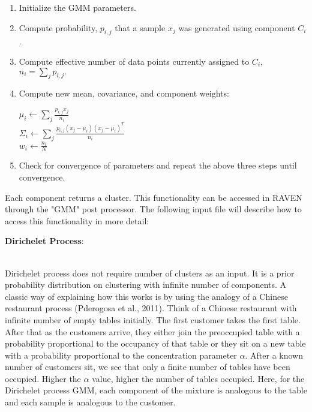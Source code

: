 \documentclass[11pt]{article}
\begin{document}
\begin{enumerate}

\item Initialize the GMM parameters.

\item Compute probability, $p_{i,j}$ that a sample $x_j$ was generated using component $C_i$.

\item Compute effective number of data points currently assigned to $C_i$, $n_i = \sum_j p_{i,j}.$

\item Compute new mean, covariance, and component weights:

\begin{center}

$\mu_i \leftarrow \sum_{j} \frac{p_{i, j} x_j}{n_i}$ \\

$\Sigma_i \leftarrow \sum_j \frac{p_{i, j}(x_j - \mu_i)(x_j - \mu_i)^T}{n_i}$ \\

$ w_i \leftarrow \frac{n_i}{N}$

\end{center}

\item Check for convergence of parameters and repeat the above three steps until convergence. 

\end{enumerate}   

Each component returns a cluster. This functionality can be accessed in RAVEN through the "GMM" post processor. The following input file will describe how to access this functionality in more detail: \\


\begin{large}
\textbf{Dirichelet Process}:
\end{large} \\

Dirichelet process does not require number of clusters as an input. It is a prior probability distribution on clustering with infinite number of components. A classic way of explaining how this works is by using the analogy of a Chinese restaurant process (Pderogosa et al., 2011). Think of a Chinese restaurant with infinite number of empty tables initially. The first customer takes the first table. After that as the customers arrive, they either join the preoccupied table with a probability proportional to the occupancy of that table or they sit on a new table with a probability proportional to the concentration parameter $\alpha$. After a known number of customers sit, we see that only a finite number of tables have been occupied. Higher the $\alpha$ value, higher the number of tables occupied. Here, for the Dirichelet process GMM, each component of the mixture is analogous to the table and each sample is analogous to the customer. 
\end{document}

